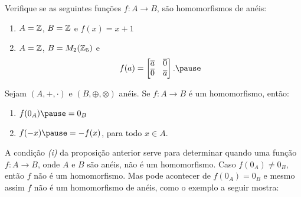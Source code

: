 \documentclass{beamer}
\begin{document}
    \begin{frame}
        \begin{exemplos}
            Verifique se as seguintes fun\c{c}\~oes $f : A \to B$, \pause s\~ao homomorfismos de an\'eis:\pause
            \begin{enumerate}[label={\roman*})]
                \item $A = \mathbb{Z}$, \pause $B = \mathbb{Z}$ \pause e $f(x) = x + 1$\pause
                \item $A = \mathbb{Z}$, \pause $B = M_2(\mathbb{Z}_5)$ \pause e
                \[
                    f(a) = \begin{bmatrix}
                        \overline{a} & \overline{0}\\
                        \overline{0} & \overline{a}
                    \end{bmatrix}.\pause
                \]
            \end{enumerate}
        \end{exemplos}
        \vspace{3cm}
    \end{frame}
    \begin{frame}
        \begin{proposicao}
            Sejam $(A, +, \cdot)$ e $(B, \oplus, \otimes)$ an\'eis. \pause Se $f : A \to B$ \'e um homomorfismo, \pause ent{\~a}o:\pause
            \begin{enumerate}[label={\roman*})]
                \item $f(0_{A}) \pause = 0_{B}$\pause

                \vspace{.5cm}

                \item $f(-x) \pause = -f(x)$, \pause para todo $x \in A$.\pause
            \end{enumerate}
        \end{proposicao}
    \end{frame}

    \begin{frame}
        \begin{observacao}
            A condi\c{c}\~ao \textit{(i)} da proposi\c{c}\~ao anterior \pause serve para determinar quando uma fun\c{c}\~ao $f : A \to B$, \pause onde $A$ e $B$ s\~ao an\'eis, n\~ao \'e um homomorfismo. \pause Caso $f(0_A) \ne 0_B$, \pause ent\~ao $f$ n\~ao \'e um homomorfismo. \pause Mas pode acontecer de $f(0_A) = 0_B$ \pause e mesmo assim $f$ n\~ao \'e um homomorfismo de an\'eis, \pause como o exemplo a seguir mostra:\pause
        \end{observacao}
    \end{frame}
\end{document}
